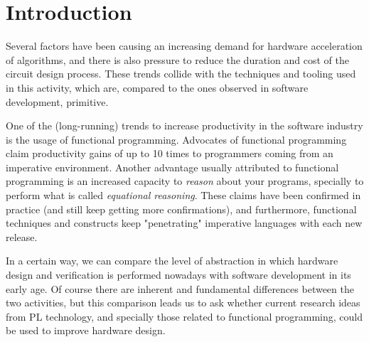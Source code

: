 \section{Introduction}
\label{sec:intro}
    Several factors have been causing an increasing demand for hardware acceleration of algorithms,
    and there is also pressure to reduce the duration and cost of the circuit design process.
    These trends collide with the techniques and tooling used in this activity, which are,
    compared to the ones observed in software development, primitive.


    One of the (long-running) trends to increase productivity in the software industry
    is the usage of functional programming.
    Advocates of functional programming claim productivity gains of up to 10 times to
    programmers coming from an imperative environment.
    Another advantage usually attributed to functional programming is an increased capacity to
    \emph{reason} about your programs, specially to perform what is called \emph{equational reasoning}.
    These claims have been confirmed in practice (and still keep getting more confirmations),
    and furthermore, functional techniques and constructs keep "penetrating" imperative languages
    with each new release. %

    In a certain way, we can compare the level of abstraction in which hardware design and verification
    is performed nowadays with software development in its early age.
    Of course there are inherent and fundamental differences between the two activities, but
    this comparison leads us to ask whether current research ideas from PL technology,
    and specially those related to functional programming, could be used to improve hardware design.

